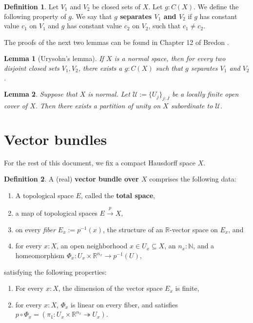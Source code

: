 \documentclass[11pt]{article}
\newcommand{\R}{\mathbb{R}}
\theoremstyle{plain}
\newtheorem{lemma}{Lemma}[section]
\theoremstyle{definition}
\newtheorem{definition}{Definition}[section]
\newcommand{\N}{\mathbb{N}}
\begin{document}
\begin{definition}\label{def:separated-by-function}
  Let \(V_1\) and \(V_2\) be closed sets of \(X\). Let \(g : C(X)\). We define the following property of \(g\). We say that \textbf{\(g\) separates \(V_1\) and \(V_2\)} if \(g\) has constant value \(c_1\) on \(V_1\) and \(g\) has constant value \(c_2\) on \(V_2\), such that \(c_1 \neq c_2\).
\end{definition}

The proofs of the next two lemmas can be found in Chapter 12 of Bredon \cite{bredon2013topology}. %

\begin{lemma}[Urysohn's lemma]\label{lemma:urysohn}
  If \(X\) is a normal space, then for every two disjoint closed sets \(V_1, V_2\), there exists a \(g : C(X)\) such that \(g\) separates \(V_1\) and \(V_2\).
\end{lemma}

\begin{lemma} \label{lemma:subordinate-partition-of-unity}
  Suppose that \(X\) is normal. Let \(\mathscr{U} := \{U_j\}_{j : J}\) be a locally finite open cover of \(X\). Then there exists a partition of unity on \(X\) subordinate to \(\mathscr{U}\).
\end{lemma}

\section{Vector bundles}
For the rest of this document, we fix a compact Hausdorff space \(X\).
\begin{definition}

\label{def:vector-bundle}
 A (real) \textbf{vector bundle over \(X\)} comprises the following data:
  \begin{enumerate}[label={(\roman*)}]
  \item A topological space \(E\), called the \textbf{total space},
  \item a map of topological spaces \(E \overset{p}{\to} X\),
  \item on every \emph{fiber} \(E_x := p^{-1}(x)\), the structure of an \(\R\)-vector space on \(E_x\), and
  \item for every \(x : X\), an open neighborhood \(x \in U_x \subseteq X\), an \(n_x : \N\), and a homeomorphism \(\Phi_x : U_x \times \R^{n_x} \to p^{-1}(U)\),
  \end{enumerate}

  satisfying the following properties:
\begin{enumerate}[label={(\alph*)}]
  \item For every \(x : X\), the dimension of the vector space \(E_x\) is finite,
  \item \label{local-triviality} for every \(x : X\), \(\Phi_x\) is linear on every fiber, and satisfies \(p \circ \Phi_x = (\pi_1 : U_x \times \R^{n_x} \twoheadrightarrow U_x)\).
\end{enumerate}
\end{definition}
\end{document}
